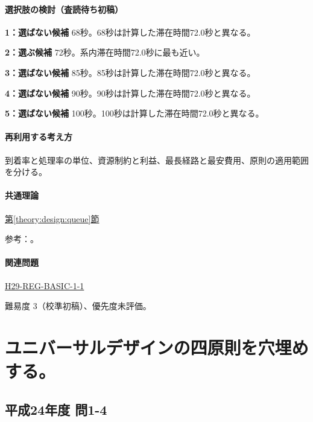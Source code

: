\paragraph{選択肢の検討（査読待ち初稿）}\mbox{}\par

\noindent\textbf{1：選ばない候補} 68秒。68秒は計算した滞在時間72.0秒と異なる。\par

\noindent\textbf{2：選ぶ候補} 72秒。系内滞在時間72.0秒に最も近い。\par

\noindent\textbf{3：選ばない候補} 85秒。85秒は計算した滞在時間72.0秒と異なる。\par

\noindent\textbf{4：選ばない候補} 90秒。90秒は計算した滞在時間72.0秒と異なる。\par

\noindent\textbf{5：選ばない候補} 100秒。100秒は計算した滞在時間72.0秒と異なる。\par

\paragraph{再利用する考え方} 到着率と処理率の単位、資源制約と利益、最長経路と最安費用、原則の適用範囲を分ける。

\paragraph{共通理論} \hyperref[theory:design:queue]{第\ref*{theory:design:queue}節}

\par 参考：\cite{design48_queue_ref}。

\paragraph{関連問題} \hyperref[q:h29-reg-basic-1-1]{H29-REG-BASIC-1-1}

\par 難易度 3（校準初稿）、優先度未評価。

\section{ユニバーサルデザインの四原則を穴埋めする。}

\subsection{平成24年度 問1-4}
\label{q:h24-reg-basic-1-4}

